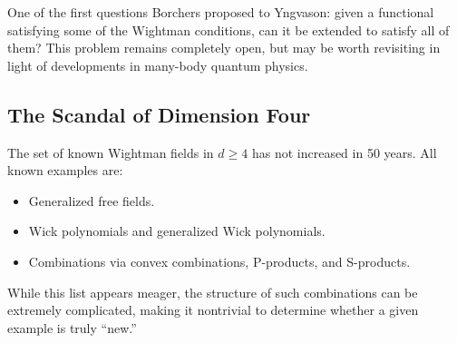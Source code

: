 \documentclass[11pt,a4paper]{article}
\begin{document}
One of the first questions Borchers proposed to Yngvason: given a functional
satisfying some of the Wightman conditions, can it be extended to satisfy
all of them? This problem remains completely open, but may be worth
revisiting in light of developments in many-body quantum physics.

\subsection{The Scandal of Dimension Four}

The set of known Wightman fields in $d \geq 4$ has not increased in
50 years. All known examples are:
\begin{itemize}[nosep]
  \item Generalized free fields.
  \item Wick polynomials and generalized Wick polynomials.
  \item Combinations via convex combinations, P-products, and S-products.
\end{itemize}

While this list appears meager, the structure of such combinations can be
extremely complicated, making it nontrivial to determine whether a given
example is truly ``new.''
\end{document}
